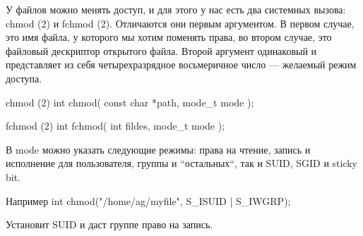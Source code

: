 У файлов можно менять доступ, и для этого у нас есть два системных вызова: chmod (2) и fchmod (2). Отличаются они первым аргументом. В первом случае, это имя файла, у которого мы хотим поменять права, во втором случае, это файловый дескриптор открытого файла. Второй аргумент одинаковый и представляет из себя четырехразрядное восьмеричное число --- желаемый режим доступа.

\begin{CCode}{chmod (2)}
	int chmod(
		const char *path, 
		mode_t mode
	); \end{CCode}

\begin{CCode}{fchmod (2)}
	int fchmod(
		int fildes, 
		mode_t mode
	); \end{CCode}

В mode можно указать следующие режимы: права на чтение, запись и исполнение для пользователя, группы и “остальных“, так и SUID, SGID и sticky bit. 

\begin{CCode}{Например}
	int chmod("/home/ag/myfile", S_ISUID | S_IWGRP); \end{CCode}

Установит SUID и даст группе право на запись.